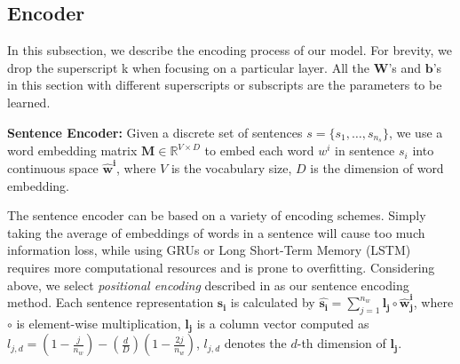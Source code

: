 \documentclass[11pt,a4paper]{article}
\begin{document}
\subsection{Encoder}

In this subsection, we describe the encoding process of our model.
For brevity, we drop the superscript k when focusing on a particular layer.
All the $\bm{W}$'s and $\bm{b}$'s in this section  with different superscripts or subscripts are the parameters to be learned.


\textbf{Sentence Encoder: } 
Given a discrete set of sentences $s = \{s_{1},\dots,s_{n_s}\}$, we use a word embedding matrix $\bm{M} \in \mathbb{R}^{V \times D}$ to embed each word $w^{i}$ in sentence $s_{i}$ into continuous space $\bm{\hat{w}^{i}}$, where $V$ is the vocabulary size, $D$ is the dimension of word embedding.

The sentence encoder can be based on a variety of encoding schemes.
Simply taking the average of embeddings of words in a sentence will cause too much information loss, while using GRUs or Long Short-Term Memory (LSTM) requires more computational resources and is prone to overfitting. 
Considering above, we select \textit{positional encoding} described in \cite{sukhbaatar2015end} as our sentence encoding method.
Each sentence representation $\bm{\hat{s_{i}}}$ is calculated by $\bm{\hat{s_{i}}}=\sum_{j=1}^{n_{w}}\bm{l_{j}} \circ \bm{\hat{w}^{i}_{j}}$, where $\circ$ is element-wise multiplication, 
$\bm{l_{j}}$ is a column vector computed as $l_{j,d}=(1-\frac{j}{n_{w}})-(\frac{d}{D})(1-\frac{2j}{n_{w}})$, $l_{j,d}$ denotes the $d$-th dimension of $\bm{l_{j}}$. 
\end{document}
